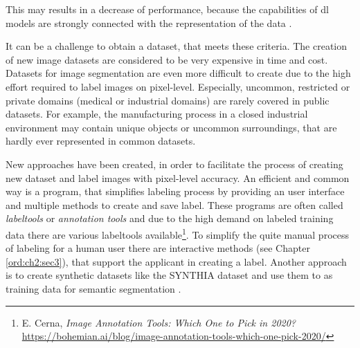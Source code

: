 \begin{itemize}
	This may results in a decrease of performance, because the capabilities of \gls{dl} models are strongly connected with the representation of the data \cite{Goodfellow-et-al-2016}.
\end{itemize} 
It can be a challenge to obtain a dataset, that meets these criteria.
The creation of new image datasets are considered to be very expensive in time and cost.
Datasets for image segmentation are even more difficult to create due to the high effort required to label images on pixel-level.
Especially, uncommon, restricted or private domains (\eg medical or industrial domains) are rarely covered in public datasets.
For example, the manufacturing process in a closed industrial environment may contain unique objects or uncommon surroundings, that are hardly ever represented in common datasets.

New approaches have been created, in order to facilitate the process of creating new dataset and label images with pixel-level accuracy.
An efficient and common way is a program, that simplifies labeling process by providing an user interface and multiple methods to create and save label.
These programs are often called \textit{labeltools} or \textit{annotation tools} and due to the high demand on labeled training data there are various labeltools available\footnote{E. Cerna, \textit{Image Annotation Tools: Which One to Pick in 2020?} \url{https://bohemian.ai/blog/image-annotation-tools-which-one-pick-2020/}}.
To simplify the quite manual process of labeling for a human user there are interactive methods (see Chapter \ref{ord:ch2:sec3}), that support the applicant in creating a label.
Another approach is to create synthetic datasets like the SYNTHIA dataset \cite{Zol19-Temporal} and use them to as training data for semantic segmentation \cite{Chen18-SyntheticData}.


